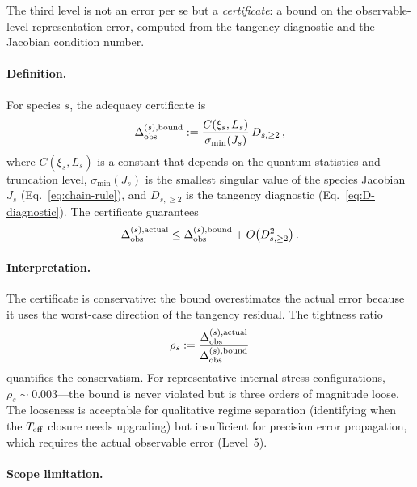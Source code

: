 The third level is not an error per se but a
\emph{certificate}: a bound on the observable-level
representation error, computed from the tangency diagnostic
and the Jacobian condition number.


\paragraph{Definition.}

For species $s$, the adequacy certificate is
\begin{equation}\label{eq:err-adequacy}
\Delta_{\rm obs}^{(s),\text{bound}}
:= \frac{C(\xi_s, L_s)}
        {\sigma_{\min}(J_s)}\,
  D_{s,\geq 2}\,,
\end{equation}
where $C(\xi_s, L_s)$ is a constant that depends on the
quantum statistics and truncation level,
$\sigma_{\min}(J_s)$ is the smallest singular value of the
species Jacobian $J_s$
(Eq.~\ref{eq:chain-rule}), and $D_{s,\geq 2}$ is the
tangency diagnostic
(Eq.~\ref{eq:D-diagnostic}).  The certificate guarantees
\begin{equation}\label{eq:adequacy-bound}
\Delta_{\rm obs}^{(s),\text{actual}}
\leq \Delta_{\rm obs}^{(s),\text{bound}}
+ O\big(D_{s,\geq 2}^2\big)\,.
\end{equation}


\paragraph{Interpretation.}

The certificate is conservative: the bound overestimates
the actual error because it uses the worst-case direction
of the tangency residual.  The tightness ratio
\begin{equation}\label{eq:tightness}
\rho_s
:= \frac{\Delta_{\rm obs}^{(s),\text{actual}}}
        {\Delta_{\rm obs}^{(s),\text{bound}}}
\end{equation}
quantifies the conservatism.  For representative internal
stress configurations,
$\rho_s \sim 0.003$---the bound is never violated but is
three orders of magnitude loose.  The looseness is
acceptable for qualitative regime separation (identifying
when the $T_{\mathrm{eff}}$ closure needs upgrading) but
insufficient for precision error propagation, which
requires the actual observable error (Level~5).


\paragraph{Scope limitation.}

